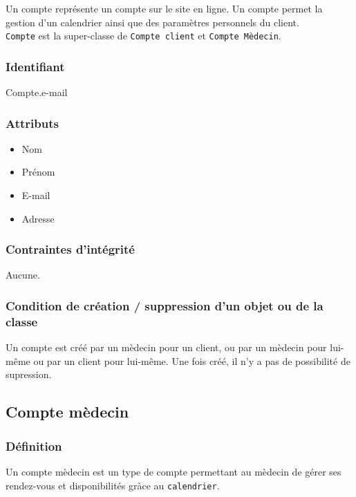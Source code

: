 \documentclass[a4paper, 11pt]{report}
\begin{document}
Un compte représente un compte sur le site en ligne. Un compte permet la gestion 
d'un calendrier ainsi que des paramètres personnels du client. \\
\texttt{Compte} est la super-classe de \texttt{Compte client} et \texttt{Compte Mèdecin}. 

\subsubsection{Identifiant}

Compte.e-mail

\subsubsection{Attributs}

\begin{itemize}
    \item Nom
    \item Prénom
    \item E-mail
    \item Adresse
\end{itemize}

\subsubsection{Contraintes d'intégrité}

Aucune.

\subsubsection{Condition de création / suppression d'un objet ou de la classe}

Un compte est créé par un mèdecin pour un client, ou par un mèdecin pour lui-même
ou par un client pour lui-même.
Une fois créé, il n'y a pas de possibilité de supression.


\subsection{Compte mèdecin}

\subsubsection{Définition}

Un compte mèdecin est un type de compte permettant au mèdecin de gérer ses rendez-vous et disponibilités
gràce au \texttt{calendrier}.
\end{document}
